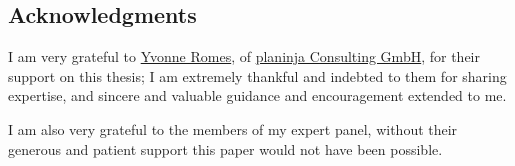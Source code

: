 \subsection{Acknowledgments}

I am very grateful to \href{https://www.linkedin.com/in/yvonne-romes/}{Yvonne Romes}, of \href{https://www.planinja.de/}{planinja Consulting GmbH}, for their support on this thesis; I am extremely thankful and indebted to them for sharing expertise, and sincere and valuable guidance and encouragement extended to me.

I am also very grateful to the members of my expert panel, without their generous and patient support this paper would not have been possible.
